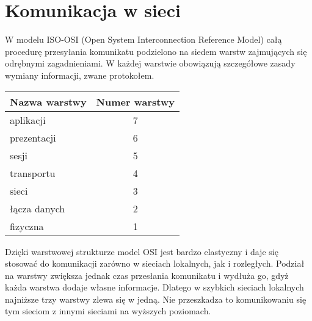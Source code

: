 \documentclass[a4paper,11pt]{article}
\theoremstyle{definition}
\begin{document}
 
\section*{Komunikacja w sieci}
 W modelu ISO-OSI (Open System Interconnection Reference Model) całą procedurę przesyłania komunikatu podzielono na siedem warstw zajmujących się odrębnymi zagadnieniami. W każdej warstwie obowiązują szczegółowe zasady wymiany informacji, zwane protokołem.
 \begin{table}[htbp]
 \begin{center}
 \begin{tabular}{|l|c|}
 	\hline
 	Nazwa warstwy& Numer warstwy \\
 	\hline \hline
 	aplikacji&7\\\hline
 	prezentacji&6\\\hline
 	sesji&5\\\hline\hline
 	transportu&4\\\hline
 	sieci&3\\\hline
 	łącza danych&2\\\hline
 	fizyczna&1\\\hline
 	
 \end{tabular}
\end{center}
 \end{table}

Dzięki warstwowej strukturze model OSI jest bardzo elastyczny i daje się stosować do komunikacji zarówno w sieciach lokalnych, jak i rozległych. Podział na warstwy zwiększa jednak czas przesłania komunikatu i wydłuża go, gdyż każda warstwa dodaje własne informacje. Dlatego w szybkich sieciach lokalnych najniższe trzy warstwy zlewa się w jedną. Nie przeszkadza to komunikowaniu się tym sieciom z innymi sieciami na wyższych poziomach.
\end{document}
